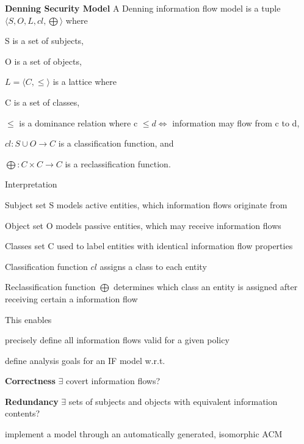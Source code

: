 \documentclass[a4paper]{article}
\renewcommand{\note}[2]{\begin{noteBox} \textbf{#1} #2 \end{noteBox}}
\begin{document}
\begin{multicols}{3}
    \note{Denning Security Model}{A Denning information flow model is a tuple $\langle S,O,L,cl,\bigoplus\rangle$ where
        \begin{itemize*}
            \item S is a set of subjects,
            \item O is a set of objects,
            \item $L=\langle C,\leq\rangle$ is a lattice where
            \begin{itemize*}
                \item C is a set of classes,
                \item $\leq$ is a dominance relation where c $\leq d \Leftrightarrow$ information may flow from c to d,
            \end{itemize*}
            \item $cl:S\cup O\rightarrow C$ is a classification function, and
            \item $\bigoplus:C\times C\rightarrow C$ is a reclassification function.
        \end{itemize*}
    }

    Interpretation
    \begin{itemize*}
        \item Subject set S models active entities, which information flows originate from
        \item Object set O models passive entities, which may receive information flows
        \item Classes set C used to label entities with identical information flow properties
        \item Classification function $cl$ assigns a class to each entity
        \item Reclassification function $\bigoplus$ determines which class an entity is assigned after receiving certain a information flow
    \end{itemize*}
    This enables
    \begin{itemize*}
        \item precisely define all information flows valid for a given policy
        \item define analysis goals for an IF model w.r.t.
        \begin{itemize*}
            \item \textbf{Correctness} $\exists$ covert information flows?
            \item \textbf{Redundancy} $\exists$ sets of subjects and objects with equivalent information contents?
        \end{itemize*}
        \item implement a model through an automatically generated, isomorphic ACM
    \end{itemize*}


\end{multicols}
\end{document}
